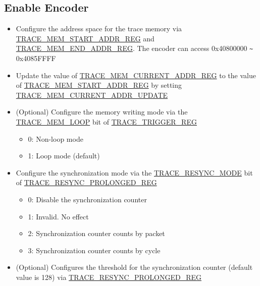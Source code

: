 \documentclass[main\_\_EN.tex]{subfiles}
\begin{document}
\subsection{Enable Encoder}


\begin{itemize}
    \item Configure the address space for the trace memory via \hyperref[regdesc:TRACEMEMSTARTADDRREG]{TRACE\_MEM\_START\_ADDR\_REG} and \hyperref[regdesc:TRACEMEMENDADDRREG]{TRACE\_MEM\_END\_ADDR\_REG}. The encoder can access 0x40800000 \verb+~+ 0x4085FFFF

    \item Update the value of \hyperref[regdesc:TRACEMEMCURRENTADDRREG]{TRACE\_MEM\_CURRENT\_ADDR\_REG} to the value of \hyperref[regdesc:TRACEMEMSTARTADDRREG]{TRACE\_MEM\_START\_ADDR\_REG} by setting \hyperref[fielddesc:TRACEMEMCURRENTADDRUPDATE]{TRACE\_MEM\_CURRENT\_ADDR\_UPDATE}


    \item (Optional) Configure the memory writing mode via the \hyperref[fielddesc:TRACEMEMLOOP]{TRACE\_MEM\_LOOP} bit of \hyperref[regdesc:TRACETRIGGERREG]{TRACE\_TRIGGER\_REG}
        \begin{itemize}
            \item 0: Non-loop mode
            \item 1: Loop mode (default)
        \end{itemize}

    \item Configure the synchronization mode via the \hyperref[fielddesc:TRACERESYNCMODE]{TRACE\_RESYNC\_MODE} bit of \hyperref[regdesc:TRACERESYNCPROLONGEDREG]{TRACE\_RESYNC\_PROLONGED\_REG}
            \begin{itemize}
                    \item 0: Disable the synchronization counter
                    \item 1: Invalid. No effect
                    \item 2: Synchronization counter counts by packet
                    \item 3: Synchronization counter counts by cycle
            \end{itemize}

    \item (Optional) Configures the threshold for the synchronization counter (default value is 128) via \hyperref[regdesc:TRACERESYNCPROLONGEDREG]{TRACE\_RESYNC\_PROLONGED\_REG}



\end{itemize}
\end{document}
